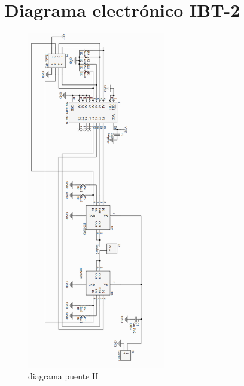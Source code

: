 \section{Diagrama electrónico IBT-2}
\begin{figure}[H]
\centering
\includegraphics[width=6cm]{Capitulo3/figs/ibt2.png}
\caption{diagrama puente H}
\end{figure}